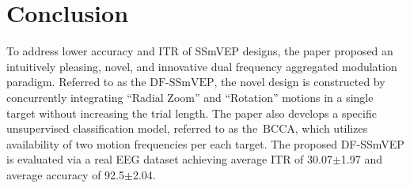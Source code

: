 \documentclass[sensors,accept,moreauthors,pdftex,10pt,a4paper]{mdpi}
\def\DFS{\text{DF-SSmVEP}} %
\def\DCCA{\text{BCCA}}
\theoremstyle{mdpi}
\newcounter{ex}
\newcounter{re}
\theoremstyle{mdpidefinition}
\begin{document}
\section{Conclusion}
To address lower accuracy and ITR of SSmVEP designs, the paper proposed an intuitively pleasing, novel, and innovative dual frequency aggregated modulation paradigm. Referred to as the $\DFS$, the novel design is constructed by concurrently integrating ``Radial Zoom'' and ``Rotation'' motions in a single target without increasing the trial length.  The paper also develops a specific unsupervised classification model, referred to as the~$\DCCA$, which utilizes availability of two motion frequencies per each target. The proposed DF-SSmVEP is evaluated via a real EEG dataset achieving average ITR of 30.07$\pm$1.97 and average accuracy of 92.5$\pm$2.04.
\end{document}

